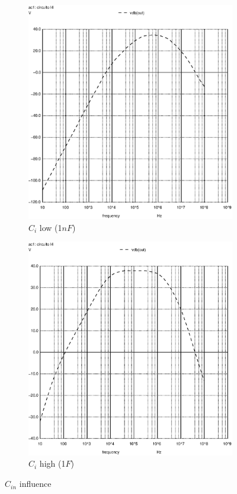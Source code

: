 \begin{figure}[h]
\centering
\begin{subfigure}{.5\textwidth}
    \centering
    \includegraphics[scale=0.33]{images/cilow_1n.eps}
    \caption{$C_i$ low (1$nF$)}
\end{subfigure}%
\begin{subfigure}{.5\textwidth}
    \centering
    \includegraphics[scale=0.33]{images/cihigh_1.eps}
    \caption{$C_i$ high (1$F$)}
\end{subfigure}
\caption{$C_{in}$ influence}
\end{figure}

